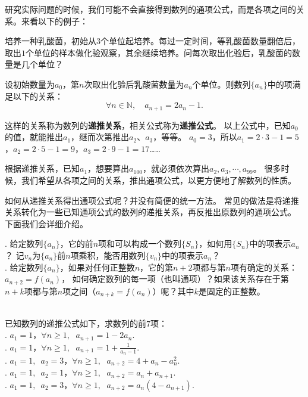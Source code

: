 \documentclass[12pt,UTF8,fontset=none]{ctexbook}
\begin{document}
研究实际问题的时候，我们可能不会直接得到数列的通项公式，而是各项之间的关系。来看以下的例子：
\begin{et}
培养一种乳酸菌，初始从$3$个单位起培养。每过一定时间，等乳酸菌数量翻倍后，
取出$1$个单位的样本做化验观察，其余继续培养。问每次取出化验后，乳酸菌的数量是几个单位？
\end{et}
\begin{so}
设初始数量为$a_0$，第$n$次取出化验后乳酸菌数量为$a_n$个单位。则数列$\{a_n\}$中的项满足以下的关系：
$$ \forall n \in \mathbb{N}, \quad a_{n+1} = 2a_n - 1. $$
\end{so}
这样的关系称为数列的\textbf{递推关系}，相关公式称为\textbf{递推公式}。
以上公式中，已知$a_0$的值，就能推出$a_1$，继而次第推出$a_2$、$a_3$，等等。
$a_0 = 3$，所以$a_1 = 2\cdot 3 - 1= 5$，$a_2 = 2\cdot 5 - 1= 9$，$a_3 = 2\cdot 9 - 1= 17$……

根据递推关系，已知$a_1$，想要算出$a_{100}$，就必须依次算出$a_2,a_3,\cdots,a_{99}$。
很多时候，我们希望从各项之间的关系，推出通项公式，以更方便地了解数列的性质。

如何从递推关系得出通项公式呢？并没有简便的统一方法。
常见的做法是将递推关系转化为一些已知通项公式的数列的递推关系，再反推出原数列的通项公式。
下面我们会详细介绍。

\begin{sk}
    . 给定数列$\{a_n\}$，它的前$n$项和可以构成一个数列$\{S_n\}$，如何用$\{S_n\}$中的项表示$a_n$？
记$v_n$为$\{a_n\}$前$n$项乘积，能否用数列$\{v_n\}$中的项表示$a_n$？\\
    . 给定数列$\{a_n\}$，如果对任何正整数$n$，它的第$n+2$项都与第$n$项有确定的关系：$a_{n+2} = f(a_n)$，
    如何确定数列的每一项（也叫通项）？如果该关系存在于第$n+k$项都与第$n$项之间（$a_{n+k} = f(a_n)$）呢？其中$k$是固定的正整数。
\end{sk}

\begin{xt}
\mbox{}\\
已知数列的递推公式如下，求数列的前$7$项：\\
. $a_1 = 1$，$\forall n \geqslant 1, \;\,\, a_{n+1} = 1 - 2a_n.$\\
. $a_1 = 1$，$\forall n \geqslant 1, \;\,\, a_{n+1} = 1 + \frac{1}{a_n - 1}.$\\
. $a_1 = 1, \,\, \, a_2 = 3$，$\forall n \geqslant 1, \;\,\, a_{n+2} = 4 + a_n - a_n^2.$\\
. $a_1 = 1, \,\, \, a_2 = 1$，$\forall n \geqslant 1, \;\,\, a_{n+2} = a_n +a_{n+1}.$\\
. $a_1 = 1, \,\, \, a_2 = 3$，$\forall n \geqslant 1, \;\,\, a_{n+2} = a_n(4 - a_{n+1}).$
\end{xt}
\end{document}
